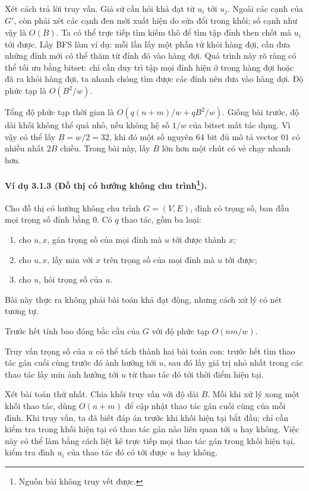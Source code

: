 \documentclass[11pt]{article}
\begin{document}
Xét cách trả lời truy vấn. Giả sử cần hỏi khả đạt từ $u_i$ tới $u_j$. Ngoài các
cạnh của $G'$, còn phải xét các cạnh đen mới xuất hiện do sửa đổi trong khối;
số cạnh như vậy là $O(B)$. Ta có thể trực tiếp tìm kiếm thô để tìm tập đỉnh then
chốt mà $u_i$ tới được. Lấy BFS làm ví dụ: mỗi lần lấy một phần tử khỏi hàng
đợi, cần đưa những đỉnh mới có thể thăm từ đỉnh đó vào hàng đợi. Quá trình này
rõ ràng có thể tối ưu bằng bitset: chỉ cần duy trì tập mọi đỉnh hiện ở trong
hàng đợi hoặc đã ra khỏi hàng đợi, ta nhanh chóng tìm được các đỉnh nên đưa vào
hàng đợi. Độ phức tạp là $O(B^2/w)$.

Tổng độ phức tạp thời gian là $O(q(n+m)/w+qB^2/w)$. Giống bài trước, độ dài khối
không thể quá nhỏ, nếu không hệ số $1/w$ của bitset mất tác dụng. Vì vậy có thể
lấy $B=w/2=32$, khi đó một số nguyên $64$ bit đủ mô tả vector $01$ có nhiều nhất
$2B$ chiều. Trong bài này, lấy $B$ lớn hơn một chút có vẻ chạy nhanh hơn.

\paragraph{Ví dụ 3.1.3 (Đồ thị có hướng không chu trình\protect\footnote{Nguồn bài không truy vết được.}).}
Cho đồ thị có hướng không chu trình $G=(V,E)$, đỉnh có trọng số, ban đầu mọi
trọng số đỉnh bằng $0$. Có $q$ thao tác, gồm ba loại:
\begin{enumerate}
  \item cho $u,x$, gán trọng số của mọi đỉnh mà $u$ tới được thành $x$;
  \item cho $u,x$, lấy min với $x$ trên trọng số của mọi đỉnh mà $u$ tới được;
  \item cho $u$, hỏi trọng số của $u$.
\end{enumerate}

Bài này thực ra không phải bài toán khả đạt động, nhưng cách xử lý có nét tương
tự.

Trước hết tính bao đóng bắc cầu của $G$ với độ phức tạp $O(nm/w)$.

Truy vấn trọng số của $u$ có thể tách thành hai bài toán con: trước hết tìm thao
tác gán cuối cùng trước đó ảnh hưởng tới $u$, sau đó lấy giá trị nhỏ nhất trong
các thao tác lấy min ảnh hưởng tới $u$ từ thao tác đó tới thời điểm hiện tại.

Xét bài toán thứ nhất. Chia khối truy vấn với độ dài $B$. Mỗi khi xử lý xong một
khối thao tác, dùng $O(n+m)$ để cập nhật thao tác gán cuối cùng của mỗi đỉnh.
Khi truy vấn, ta đã biết đáp án trước khi khối hiện tại bắt đầu; chỉ cần kiểm
tra trong khối hiện tại có thao tác gán nào liên quan tới $u$ hay không. Việc
này có thể làm bằng cách liệt kê trực tiếp mọi thao tác gán trong khối hiện tại,
kiểm tra đỉnh $u_i$ của thao tác đó có tới được $u$ hay không.
\end{document}
